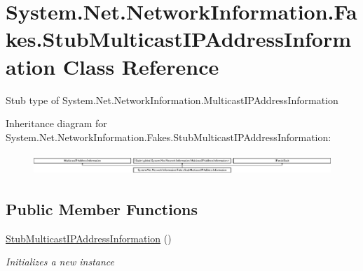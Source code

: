 \hypertarget{class_system_1_1_net_1_1_network_information_1_1_fakes_1_1_stub_multicast_i_p_address_information}{\section{System.\-Net.\-Network\-Information.\-Fakes.\-Stub\-Multicast\-I\-P\-Address\-Information Class Reference}
\label{class_system_1_1_net_1_1_network_information_1_1_fakes_1_1_stub_multicast_i_p_address_information}
}


Stub type of System.\-Net.\-Network\-Information.\-Multicast\-I\-P\-Address\-Information 


Inheritance diagram for System.\-Net.\-Network\-Information.\-Fakes.\-Stub\-Multicast\-I\-P\-Address\-Information\-:\begin{figure}[H]
\begin{center}
\leavevmode
\includegraphics[height=0.813362cm]{class_system_1_1_net_1_1_network_information_1_1_fakes_1_1_stub_multicast_i_p_address_information}
\end{center}
\end{figure}
\subsection*{Public Member Functions}
\begin{DoxyCompactItemize}
\item 
\hyperlink{class_system_1_1_net_1_1_network_information_1_1_fakes_1_1_stub_multicast_i_p_address_information_aad8e63edf9749e1e8ddfcb06638ba249}{Stub\-Multicast\-I\-P\-Address\-Information} ()
\begin{DoxyCompactList}\small\item\em Initializes a new instance\end{DoxyCompactList}\end{DoxyCompactItemize}
